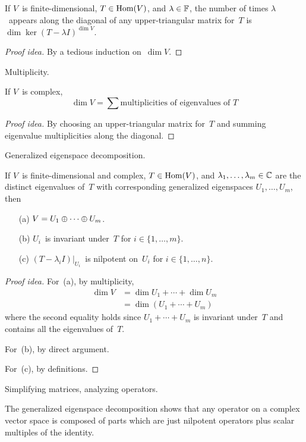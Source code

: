 \begin{thm}
If \(V\)~is finite-dimensional, \(T\in\operatorname{Hom}(V)\), and \(\lambda\in\mathbb{F}\), the number of times \(\lambda\)~appears along the diagonal of any upper-triangular matrix for~\(T\) is \(\dim\ker(T-\lambda I)^{\dim V}\).
\end{thm}
\begin{proof}[Proof idea]
By a tedious induction on~\(\dim V\).
\end{proof}
\begin{app}
Multiplicity.
\end{app}

\begin{cor}
If \(V\)~is complex,
\[\dim V=\sum\text{multiplicities of eigenvalues of~\(T\)}\]
\end{cor}
\begin{proof}[Proof idea]
By choosing an upper-triangular matrix for~\(T\) and summing eigenvalue multiplicities along the diagonal.
\end{proof}
\begin{app}
Generalized eigenspace decomposition.
\end{app}

\begin{thm}
If \(V\)~is finite-dimensional and complex, \(T\in\operatorname{Hom}(V)\), and \(\lambda_1,\ldots,\lambda_m\in\mathbb{C}\) are the distinct eigenvalues of~\(T\) with corresponding generalized eigenspaces \(U_1,\ldots,U_m\), then
\begin{enumerate}[itemsep=0pt]
\item[(a)] \(V=U_1\oplus\cdots\oplus U_m\).
\item[(b)] \(U_i\)~is invariant under~\(T\) for \(i\in\{1,\ldots,m\}\).
\item[(c)] \((T-\lambda_i I)|_{U_i}\)~is nilpotent on~\(U_i\) for \(i\in\{1,\ldots,n\}\).
\end{enumerate}
\end{thm}
\begin{proof}[Proof idea]
For~(a), by multiplicity,
\begin{align*}
\dim V&=\dim U_1+\cdots+\dim U_m\\
	&=\dim(U_1+\cdots+U_m)
\end{align*}
where the second equality holds since \(U_1+\cdots+U_m\) is invariant under~\(T\) and contains all the eigenvalues of~\(T\).

For~(b), by direct argument.

For~(c), by definitions.
\end{proof}
\begin{app}
Simplifying matrices, analyzing operators.
\end{app}
\begin{rmk}
The generalized eigenspace decomposition shows that any operator on a complex vector space is composed of parts which are just nilpotent operators plus scalar multiples of the identity.
\end{rmk}

